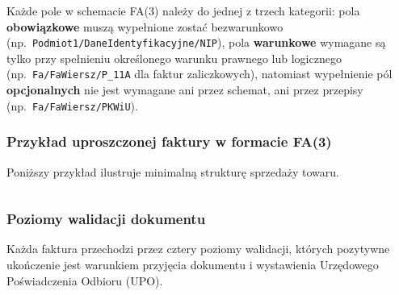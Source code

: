 Każde pole w schemacie FA(3) należy do jednej z trzech kategorii: pola \textbf{obowiązkowe} muszą wypełnione zostać bezwarunkowo (np.\ \texttt{Podmiot1/\allowbreak{}DaneIdentyfikacyjne/\allowbreak{}NIP}), pola \textbf{warunkowe} wymagane są tylko przy spełnieniu określonego warunku prawnego lub logicznego (np.\ \texttt{Fa/FaWiersz/P\_11A} dla faktur zaliczkowych), natomiast wypełnienie pól \textbf{opcjonalnych} nie jest wymagane ani przez schemat, ani przez przepisy (np.\ \texttt{Fa/FaWiersz/PKWiU}). \cite{ksef-fa3-infosheet}

\subsubsection{Przykład uproszczonej faktury w formacie FA(3)}
\label{sec:ksef-fa3-przyklad}

Poniższy przykład ilustruje minimalną strukturę sprzedaży towaru.

\inputminted[fontsize=\footnotesize, breaklines, frame=lines, linenos]{xml}{chapters/02-analiza-ksef/fa3-example.xml}

\subsubsection{Poziomy walidacji dokumentu}
\label{sec:ksef-walidacja}

Każda faktura przechodzi przez cztery poziomy walidacji, których pozytywne ukończenie jest warunkiem przyjęcia dokumentu i wystawienia Urzędowego Poświadczenia Odbioru (UPO).

